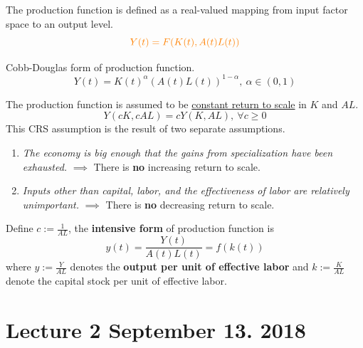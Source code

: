 \documentclass[]{article}
\begin{document}
            \begin{definition}
                The production function is defined as a real-valued mapping from input factor space to an output level.
	            \begin{equation}
                    \textcolor{orange}{Y(t) = F(K(t), A(t)L(t))}
	            \end{equation}
            \end{definition}
            
            \begin{example}
            	    Cobb-Douglas form of production function.
                \[
                    Y(t) = K(t)^\alpha (A(t)L(t))^{1 - \alpha},\ \alpha \in (0, 1)
                \]
            \end{example}
            
            \begin{assumption} The production function is assumed to be \ul{constant return to scale} in $K$ and $AL$.
            \[
            	Y(cK, cAL) = cY(K, AL),\ \forall c \geq 0
            \]
           	This CRS assumption is the result of two separate assumptions.
           	\begin{enumerate}
           		\item \emph{The economy is big enough that the gains from specialization have been exhausted.} $\implies$ There is \textbf{no} increasing return to scale.
           		\item \emph{Inputs other than capital, labor, and the effectiveness of labor are relatively unimportant.} $\implies$ There is \textbf{no} decreasing return to scale.
           	\end{enumerate}
            \end{assumption}
            
            \begin{definition}
                Define $c := \frac{1}{AL}$, the \textbf{intensive form} of production function is
                \[
                    y(t) = \frac{Y(t)}{A(t)L(t)} = f(k(t))
                \]
                where $y := \frac{Y}{AL}$ denotes the \textbf{output per unit of effective labor} and $k := \frac{K}{AL}$ denote the capital stock per unit of effective labor.
            \end{definition}
	
	\section{Lecture 2 September 13. 2018}
\end{document}
